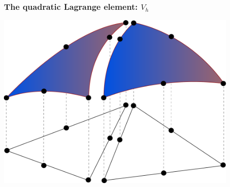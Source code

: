 \begin{frame}
  \frametitle{The quadratic Lagrange element: $V_h$}

  \begin{center}
    \includegraphics[width=0.9\textwidth]{pdf/femspace.pdf}
  \end{center}

\end{frame}
